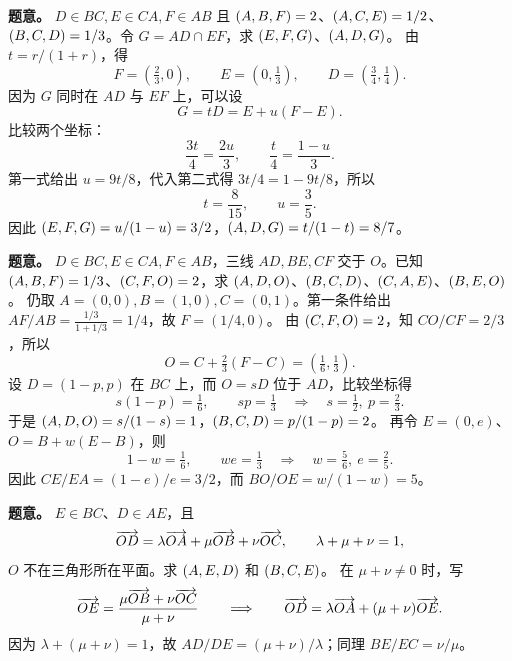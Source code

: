 \textbf{题意。} $D\in BC,E\in CA,F\in AB$ 且 $(A,B,F)=2$、$(A,C,E)=1/2$、$(B,C,D)=1/3$。令 $G=AD\cap EF$，求 $(E,F,G)$、$(A,D,G)$。
由 $t=r/(1+r)$，得
\[
F=(\tfrac23,0),\qquad E=(0,\tfrac13),\qquad D=(\tfrac34,\tfrac14).
\]
因为 $G$ 同时在 $AD$ 与 $EF$ 上，可以设
\[
G=tD=E+u(F-E).
\]
比较两个坐标：
\[
\frac{3t}{4}=\frac{2u}{3},\qquad
\frac{t}{4}=\frac{1-u}{3}.
\]
第一式给出 $u=9t/8$，代入第二式得 $3t/4=1-9t/8$，所以
\[
t=\frac8{15},\qquad u=\frac35.
\]
因此 $(E,F,G)=u/(1-u)=3/2$，$(A,D,G)=t/(1-t)=8/7$。

\textbf{题意。} $D\in BC,E\in CA,F\in AB$，三线 $AD,BE,CF$ 交于 $O$。已知 $(A,B,F)=1/3$、$(C,F,O)=2$，求 $(A,D,O)$、$(B,C,D)$、$(C,A,E)$、$(B,E,O)$。
仍取 $A=(0,0),B=(1,0),C=(0,1)$。第一条件给出 $AF/AB=\frac{1/3}{1+1/3}=1/4$，故 $F=(1/4,0)$。
由 $(C,F,O)=2$，知 $CO/CF=2/3$，所以
\[
O=C+\tfrac23(F-C)=(\tfrac16,\tfrac13).
\]
设 $D=(1-p,p)$ 在 $BC$ 上，而 $O=sD$ 位于 $AD$，比较坐标得
\[
s(1-p)=\tfrac16,\qquad sp=\tfrac13
\quad\Longrightarrow\quad s=\tfrac12,\ p=\tfrac23.
\]
于是 $(A,D,O)=s/(1-s)=1$，$(B,C,D)=p/(1-p)=2$。
再令 $E=(0,e)$、$O=B+w(E-B)$，则
\[
1-w=\tfrac16,\qquad we=\tfrac13
\quad\Longrightarrow\quad w=\tfrac56,\ e=\tfrac25.
\]
因此 $CE/EA=(1-e)/e=3/2$，而 $BO/OE=w/(1-w)=5$。

\textbf{题意。} $E\in BC$、$D\in AE$，且
\[
\overrightarrow{OD}=\lambda\overrightarrow{OA}+\mu\overrightarrow{OB}+\nu\overrightarrow{OC},\qquad
\lambda+\mu+\nu=1,
\]
$O$ 不在三角形所在平面。求 $(A,E,D)$ 和 $(B,C,E)$。
在 $\mu+\nu\neq0$ 时，写
\[
\overrightarrow{OE}=\frac{\mu\overrightarrow{OB}+\nu\overrightarrow{OC}}{\mu+\nu}
\qquad\Longrightarrow\qquad
\overrightarrow{OD}=\lambda\overrightarrow{OA}+(\mu+\nu)\overrightarrow{OE}.
\]
因为 $\lambda+(\mu+\nu)=1$，故 $AD/DE=(\mu+\nu)/\lambda$；同理 $BE/EC=\nu/\mu$。

